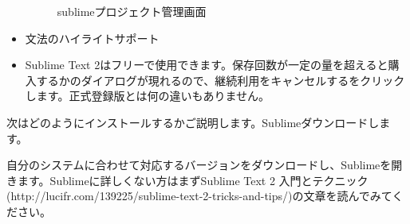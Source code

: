 \begin{itemize}
\begin{figure}[H]
   \label{図1.6}
   \caption{sublimeプロジェクト管理画面}
\end{figure}
  \item 文法のハイライトサポート
  \item Sublime Text 2はフリーで使用できます。保存回数が一定の量を超えると購入するかのダイアログが現れるので、継続利用をキャンセルするをクリックします。正式登録版とは何の違いもありません。
\end{itemize}


次はどのようにインストールするかご説明します。Sublimeダウンロードします。

自分のシステムに合わせて対応するバージョンをダウンロードし、Sublimeを開きます。Sublimeに詳しくない方はまずSublime Text 2 入門とテクニック(http:\//\//lucifr.com\//139225\//sublime-text-2-tricks-and-tips\//)の文章を読んでみてください。

